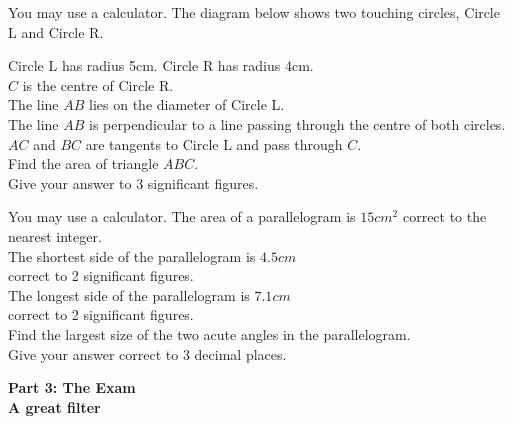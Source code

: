 \documentclass{exam}
\newenvironment{nscenter}
 {\parskip=0pt\par\nopagebreak\centering}
 {\par\noindent\ignorespacesafterend}
\begin{document}
\begin{questions}
    \question You may use a calculator. The diagram below shows two touching circles, Circle L and Circle R.\\
    \begin{nscenter}
    \end{nscenter}
    Circle L has radius 5cm. Circle R has radius 4cm.\\
    $C$ is the centre of Circle R.\\
    The line $AB$ lies on the diameter of Circle L.\\
    The line $AB$ is perpendicular to a line passing through the centre of both circles.\\
    $AC$ and $BC$ are tangents to Circle L and pass through $C$.\\

    Find the area of triangle $ABC$.\\
    Give your answer to 3 significant figures.
    \newpage

    \question You may use a calculator. The area of a parallelogram is $15cm^2$ correct to the nearest integer.\\
    The shortest side of the parallelogram is $4.5cm$\\ correct to 2 significant figures.\\
    The longest side of the parallelogram is $7.1cm$\\ correct to 2 significant figures.\\

    Find the largest size of the two acute angles in the parallelogram.\\
    Give your answer correct to 3 decimal places.
    
\end{questions}

\newpage
\begin{titlepage}
    \begin{center}

        \vspace*{\fill}
        \Huge \textbf{Part 3: The Exam}\\
        \vspace*{1cm}
        \vspace*{1cm}
        \large \textbf{A great filter}\\
        \vspace*{\fill}
        
    \end{center}
\end{titlepage}
\newpage
\end{document}
